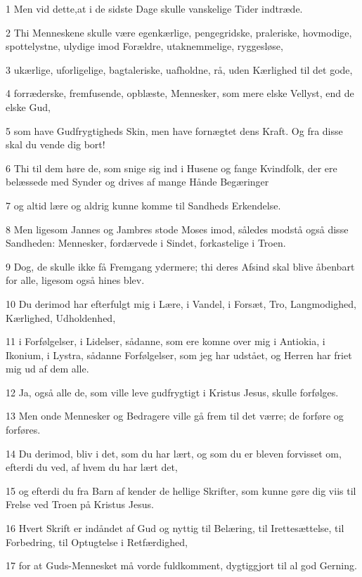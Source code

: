\par 1 Men vid dette,at i de sidste Dage skulle vanskelige Tider indtræde.
\par 2 Thi Menneskene skulle være egenkærlige, pengegridske, praleriske, hovmodige, spottelystne, ulydige imod Forældre, utaknemmelige, ryggesløse,
\par 3 ukærlige, uforligelige, bagtaleriske, uafholdne, rå, uden Kærlighed til det gode,
\par 4 forræderske, fremfusende, opblæste, Mennesker, som mere elske Vellyst, end de elske Gud,
\par 5 som have Gudfrygtigheds Skin, men have fornægtet dens Kraft. Og fra disse skal du vende dig bort!
\par 6 Thi til dem høre de, som snige sig ind i Husene og fange Kvindfolk, der ere belæssede med Synder og drives af mange Hånde Begæringer
\par 7 og altid lære og aldrig kunne komme til Sandheds Erkendelse.
\par 8 Men ligesom Jannes og Jambres stode Moses imod, således modstå også disse Sandheden: Mennesker, fordærvede i Sindet, forkastelige i Troen.
\par 9 Dog, de skulle ikke få Fremgang ydermere; thi deres Afsind skal blive åbenbart for alle, ligesom også hines blev.
\par 10 Du derimod har efterfulgt mig i Lære, i Vandel, i Forsæt, Tro, Langmodighed, Kærlighed, Udholdenhed,
\par 11 i Forfølgelser, i Lidelser, sådanne, som ere komne over mig i Antiokia, i Ikonium, i Lystra, sådanne Forfølgelser, som jeg har udstået, og Herren har friet mig ud af dem alle.
\par 12 Ja, også alle de, som ville leve gudfrygtigt i Kristus Jesus, skulle forfølges.
\par 13 Men onde Mennesker og Bedragere ville gå frem til det værre; de forføre og forføres.
\par 14 Du derimod, bliv i det, som du har lært, og som du er bleven forvisset om, efterdi du ved, af hvem du har lært det,
\par 15 og efterdi du fra Barn af kender de hellige Skrifter, som kunne gøre dig viis til Frelse ved Troen på Kristus Jesus.
\par 16 Hvert Skrift er indåndet af Gud og nyttig til Belæring, til Irettesættelse, til Forbedring, til Optugtelse i Retfærdighed,
\par 17 for at Guds-Mennesket må vorde fuldkomment, dygtiggjort til al god Gerning.

